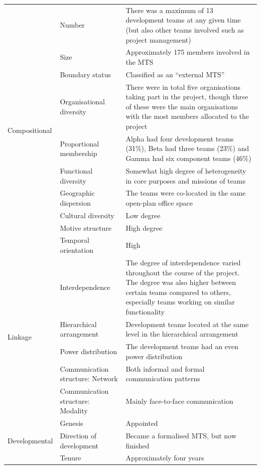 \begin{center}
\begin{longtable}{ | p{2.5cm} | p{4cm} | p{8cm} | }
	\multirow{10}{*}{Compositional} & Number & There was a maximum of 13 development teams at any given time (but also other teams involved such as project management) \\ \cline{2-3}
 	& Size & Approximately 175 members involved in the MTS \\ \cline{2-3}
 	& Boundary status & Classified as an ``external MTS'' \\ \cline{2-3}
 	& Organisational diversity & There were in total five organisations taking part in the project, though three of these were the main organisations with the most members allocated to the project \\ \cline{2-3}
	& Proportional membership & Alpha had four development teams (31\%), Beta had three teams (23\%) and Gamma had six component teams (46\%) \\ \cline{2-3}
	& Functional diversity & Somewhat high degree of heterogeneity in core purposes and missions of teams \\ \cline{2-3}
	& Geographic dispersion & The teams were co-located in the same open-plan office space \\ \cline{2-3}
	& Cultural diversity & Low degree \\ \cline{2-3}
	& Motive structure & High degree \\ \cline{2-3}
	& Temporal orientation & High \\ \cline{2-3}
\hline
	\multirow{5}{*}{Linkage} & Interdependence & The degree of interdependence varied throughout the course of the project. The degree was also higher between certain teams compared to others, especially teams working on similar functionality \\ \cline{2-3}
 	& Hierarchical arrangement & Development teams located at the same level in the hierarchical arrangement \\ \cline{2-3}
 	& Power distribution & The development teams had an even power distribution \\ \cline{2-3}
	& Communication structure: Network & Both informal and formal communication patterns \\ \cline{2-3}
	& Communication structure: Modality & Mainly face-to-face communication \\ \cline{2-3}
\hline
	\multirow{6}{*}{Developmental} & Genesis & Appointed \\ \cline{2-3}
 	& Direction of development & Became a formalised MTS, but now finished \\ \cline{2-3}
	& Tenure & Approximately four years \\ \cline{2-3}

\end{longtable}
\end{center}
